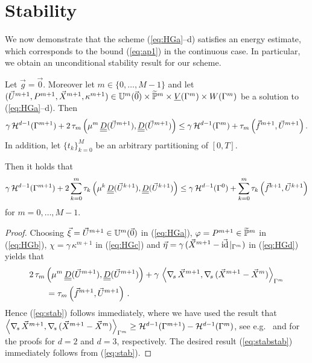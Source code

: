 \section{Stability}\label{sec:stokes_stability}
We now demonstrate that the scheme (\ref{eq:HGa}--d) satisfies an energy
estimate, which corresponds to the bound (\ref{eq:ap1}) in the continuous case.
In particular, we obtain an unconditional stability result for our scheme.

\begin{theorem} \label{thm:stabstab}
\sloppy Let $\vec g=\vec 0$. Moreover let $m \in \{0,\ldots,M-1\}$ and let
${(\vec U^{m+1},P^{m+1},\vec X^{m+1}, \kappa^{m+1}) \in \uspacedisc{0}{m}\times
\pnormspace^m \times \Vh \times \Wh}$ be a solution to (\ref{eq:HGa}--d). Then
\begin{equation}\label{eq:stab}
\gamma\, \surfvol(\Gamma^{m+1})
+ 2\,\tau_m\left(\mu^m\,\mat D(\vec U^{m+1}), \mat D(\vec U^{m+1}) \right) \leq
\gamma\,\surfvol(\Gamma^m) + \tau_m\left( \vec f^{m+1}, \vec U^{m+1}
\right).
\end{equation}
In addition, let $\{t_k\}_{k=0}^M$ be an arbitrary partitioning of $[0,T]$.

Then it holds that
\begin{equation}\label{eq:stabstab}
\gamma\,\surfvol(\Gamma^{m+1})
+ 2 \sum_{k=0}^m  \tau_k\left(\mu^k\,\mat D(\vec U^{k+1}), \mat D(\vec U^{k+1})
\right)\leq \gamma\,\surfvol(\Gamma^0) + \sum_{k=0}^m \tau_k\left(\vec
f^{k+1}, \vec U^{k+1} \right)
\end{equation}
for $m=0,\ldots, M-1$.
\end{theorem}
\begin{proof}
Choosing $\vec\xi = \vec U^{m+1} \in \uspacedisc{0}{m}$ in (\ref{eq:HGa}),
$\varphi = P^{m+1} \in \pnormspace^m$ in (\ref{eq:HGb}),
$\chi = \gamma\,\kappa^{m+1}$ in (\ref{eq:HGc}) and
$\vec\eta=\gamma\,({\vec X^{m+1}-\vec\id\!\mid_{\Gamma^m}})$ in (\ref{eq:HGd})
yields that
\begin{align*}
& 2\,\tau_m\left(\mu^m\,\mat D(\vec U^{m+1}), \mat D(\vec U^{m+1}) \right)
+ \gamma\,\left\langle \nabs\,\vec X^{m+1}, \nabs\,(\vec X^{m+1} - \vec X^m)
\right\rangle_{\Gamma^m} \nonumber \\
& \qquad = \tau_m\left(\vec f^{m+1}, \vec U^{m+1} \right)\,.
\end{align*}
Hence (\ref{eq:stab}) follows immediately, where we have used the result that
$\left\langle \nabs\,\vec X^{m+1}, \nabs\,(\vec X^{m+1} - \vec X^m)
\right\rangle_{\Gamma^m} \geq \surfvol(\Gamma^{m+1}) - \surfvol(\Gamma^m)$,
see e.g.\ \cite[Proof of Theorem~2.3]{triplej} and
\cite[Proof of Theorem~2.2]{gflows3d} for the proofs for $d=2$ and $d=3$,
respectively. The desired result (\ref{eq:stabstab}) immediately follows from
(\ref{eq:stab}).
\end{proof}

